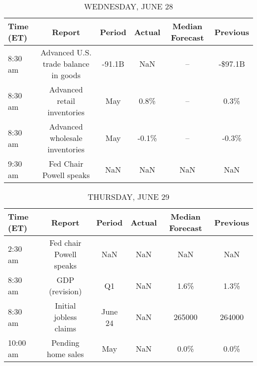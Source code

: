 \documentclass{article}%
\begin{document}
\begin{table}[htbp]%
\caption{WEDNESDAY, JUNE 28}%
\centering%
\begin{adjustbox}{width=1\textwidth}%
\begin{tabular}{lccccc}
\toprule
Time (ET) &                               Report & Period & Actual & Median Forecast & Previous \\
\midrule
  8:30 am & Advanced U.S. trade balance in goods & -91.1B &    NaN &              -- &  -\$97.1B \\
  8:30 am &          Advanced retail inventories &    May &   0.8\% &              -- &     0.3\% \\
  8:30 am &       Advanced wholesale inventories &    May &  -0.1\% &              -- &    -0.3\% \\
  9:30 am &              Fed Chair Powell speaks &    NaN &    NaN &             NaN &      NaN \\
\bottomrule
\end{tabular}
%
\end{adjustbox}%
\end{table}

%


\begin{table}[htbp]%
\caption{THURSDAY, JUNE 29}%
\centering%
\begin{adjustbox}{width=1\textwidth}%
\begin{tabular}{lccccc}
\toprule
Time (ET) &                  Report &  Period & Actual & Median Forecast & Previous \\
\midrule
  2:30 am & Fed chair Powell speaks &     NaN &    NaN &             NaN &      NaN \\
  8:30 am &          GDP (revision) &      Q1 &    NaN &            1.6\% &     1.3\% \\
  8:30 am &  Initial jobless claims & June 24 &    NaN &          265000 &   264000 \\
 10:00 am &      Pending home sales &     May &    NaN &            0.0\% &     0.0\% \\
\bottomrule
\end{tabular}
%
\end{adjustbox}%
\end{table}

%
\end{document}
